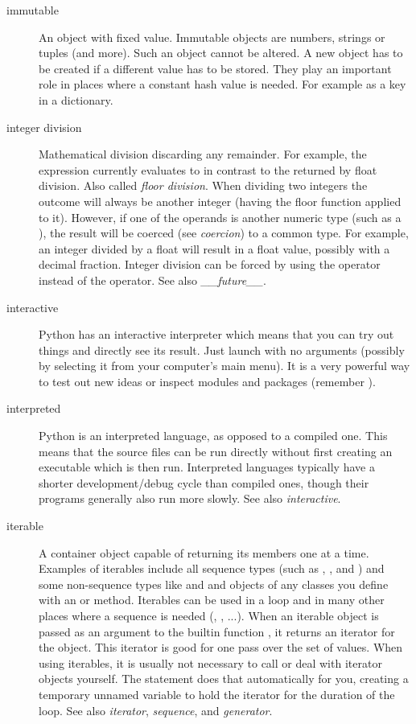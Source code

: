 \begin{description}
\item[immutable]
An object with fixed value.  Immutable objects are numbers, strings or
tuples (and more).  Such an object cannot be altered.  A new object
has to be created if a different value has to be stored.  They play an
important role in places where a constant hash value is needed.  For
example as a key in a dictionary.

\item[integer division]
Mathematical division discarding any remainder.  For example, the
expression  currently evaluates to  in contrast
to the  returned by float division.  Also called
{}\emph{floor division}.  When dividing two integers the outcome will
always be another integer (having the floor function applied to it).
However, if one of the operands is another numeric type (such as a
{}), the result will be coerced (see \emph{coercion}) to
a common type.  For example, an integer divided by a float will result
in a float value, possibly with a decimal fraction.  Integer division
can be forced by using the \code{//} operator instead of the \code{/}
operator.  See also \emph{__future__}.

\item[interactive]
Python has an interactive interpreter which means that you can try out
things and directly see its result.  Just launch  with no
arguments (possibly by selecting it from your computer's main menu).
It is a very powerful way to test out new ideas or inspect modules and
packages (remember ).

\item[interpreted]
Python is an interpreted language, as opposed to a compiled one.  This means
that the source files can be run directly without first creating an
executable which is then run.  Interpreted languages typically have a
shorter development/debug cycle than compiled ones, though their programs
generally also run more slowly.  See also {}\emph{interactive}.

\item[iterable]
A container object capable of returning its members one at a time.
Examples of iterables include all sequence types (such as ,
{}, and ) and some non-sequence types like
{} and  and objects of any classes you define
with an  or  method.  Iterables
can be used in a  loop and in many other places where a
sequence is needed (, , ...).  When an
iterable object is passed as an argument to the builtin function
{}, it returns an iterator for the object.  This
iterator is good for one pass over the set of values.  When using
iterables, it is usually not necessary to call  or
deal with iterator objects yourself.  The  statement does
that automatically for you, creating a temporary unnamed variable to
hold the iterator for the duration of the loop.  See also
{}\emph{iterator}, \emph{sequence}, and \emph{generator}.


\end{description}
